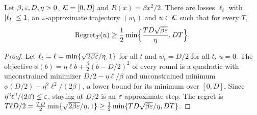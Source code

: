 \begin{theorem}
  \label{thm:lb_smooth}
  \leanok
  Let $\beta, \varepsilon, D, \eta > 0$, $\mathcal{K} = [0, D]$ and $R(x) = \beta x^2 / 2$. There are losses
  $\ell_t$ with $\lvert \ell_t \rvert \le 1$, an $\varepsilon$-approximate trajectory $(w_t)$ and $u \in \mathcal{K}$ such
  that for every $T$,
  \[ \mathrm{Regret}_T(u) \ge \frac12 \min\Bigl\{ \frac{T D \sqrt{\beta \varepsilon}}{\eta}, D T
    \Bigr\}. \]
\end{theorem}

\begin{proof}
  \leanok
  Let $\ell_t = \ell = \min\{\sqrt{2 \beta \varepsilon} / \eta, 1\}$ for all $t$ and $w_t = D/2$ for all
  $t$, $u = 0$. The objective $\phi(b) = \eta \ell b + \frac\beta2 (b - D/2)^2$ of every round is a
  quadratic with unconstrained minimizer $D/2 - \eta\ell/\beta$ and unconstrained minimum
  $\phi(D/2) - \eta^2\ell^2/(2\beta)$, a lower bound for its minimum over $[0, D]$. Since
  $\eta^2 \ell^2 / (2 \beta) \le \varepsilon$, staying at $D/2$ is an $\varepsilon$-approximate step. The regret
  is $T \ell D / 2 = \frac{TD}{2}\min\{\sqrt{2\beta\varepsilon}/\eta, 1\} \ge
  \frac12\min\{TD\sqrt{\beta\varepsilon}/\eta, DT\}$.
\end{proof}
